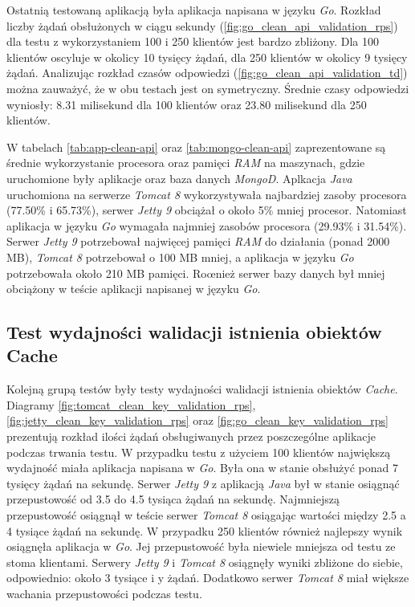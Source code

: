 Ostatnią testowaną aplikacją była aplikacja napisana w języku \textsl{Go}. Rozkład liczby żądań obsłużonych w ciągu sekundy (\ref{fig:go_clean_api_validation_rps}) dla testu z wykorzystaniem 100 i 250 klientów jest bardzo zbliżony. Dla 100 klientów oscyluje w okolicy 10 tysięcy żądań, dla 250 klientów w okolicy 9 tysięcy żądań. Analizując rozkład czasów odpowiedzi (\ref{fig:go_clean_api_validation_td}) można zauważyć, że w obu testach jest on symetryczny. Średnie czasy odpowiedzi wyniosły: 8.31 milisekund dla 100 klientów oraz 23.80 milisekund dla 250 klientów.

W tabelach \ref{tab:app-clean-api} oraz \ref{tab:mongo-clean-api} zaprezentowane są średnie wykorzystanie procesora oraz pamięci \textsl{RAM} na maszynach, gdzie uruchomione były aplikacje oraz baza danych \textsl{MongoD}. Aplkacja \textsl{Java} uruchomiona na serwerze \textsl{Tomcat 8} wykorzystywała najbardziej zasoby procesora (77.50\% i 65.73\%), serwer \textsl{Jetty 9} obciążał o około 5\% mniej procesor. Natomiast aplikacja w języku \textsl{Go} wymagała najmniej zasobów procesora (29.93\% i 31.54\%). Serwer \textsl{Jetty 9} potrzebował najwięcej pamięci \textsl{RAM} do działania (ponad 2000 MB), \textsl{Tomcat 8} potrzebował o 100 MB mniej, a aplikacja w języku \textsl{Go} potrzebowała około 210 MB pamięci. Roœnież serwer bazy danych był mniej obciążony w teście aplikacji napisanej w języku \textsl{Go}.



\clearpage

\subsection{Test wydajności walidacji istnienia obiektów Cache}
Kolejną grupą testów były testy wydajności walidacji istnienia obiektów \textsl{Cache}. Diagramy \ref{fig:tomcat_clean_key_validation_rps},  \ref{fig:jetty_clean_key_validation_rps} oraz  \ref{fig:go_clean_key_validation_rps} prezentują rozkład ilości żądań obsługiwanych przez poszczególne aplikacje podczas trwania testu. W przypadku testu z użyciem 100 klientów największą wydajność miała aplikacja napisana w \textsl{Go}. Była ona w stanie obsłużyć ponad 7 tysięcy żądań na sekundę. Serwer \textsl{Jetty 9} z aplikacją \textsl{Java} był w stanie osiągnąć przepustowość od 3.5 do 4.5 tysiąca żądań na sekundę. Najmniejszą przepustowość osiągnął w teście serwer \textsl{Tomcat 8} osiągając wartości między 2.5 a 4 tysiące żądań na sekundę. W przypadku 250 klientów również najlepszy wynik osiągnęła aplikacja w \textsl{Go}. Jej przepustowość była niewiele mniejsza od testu ze stoma klientami. Serwery \textsl{Jetty 9} i \textsl{Tomcat 8} osiągnęły wyniki zbliżone do siebie, odpowiednio: około 3 tysiące i y żądań. Dodatkowo serwer \textsl{Tomcat 8} miał większe wachania przepustowości podczas testu.

